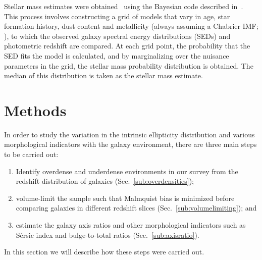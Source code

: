 \documentclass[twocolumn,useAMS,usenatbib]{mn2e}
\newcommand{\rachel}[1]{{\textcolor{red}{#1}}}
\newcommand{\sersic}{S\'{e}rsic }
\begin{document}
Stellar mass estimates were obtained~\citep{COSMOS_XRAY} using the
Bayesian code described in~\cite{KEVIN_MSTAR}.  This process involves
constructing a grid of models that vary in age, star formation
history, dust content and metallicity (always assuming a Chabrier IMF;
\citealt{ChabrierIMF}), 
 to which the observed galaxy spectral energy distributions (SEDs) and photometric redshift are compared. At each grid point, the probability that the 
SED fits the model is calculated, and by marginalizing over the nuisance parameters in the grid, the stellar mass probability distribution is obtained. The median of this distribution
is taken as the stellar mass estimate. 
  

\section{Methods}
\label{S:methods}

In order to study the variation in the intrinsic ellipticity
distribution and various morphological indicators with the galaxy environment, there are three main steps to be carried out:
\begin{enumerate}
 \item Identify overdense and underdense environments in our survey
   from the redshift distribution of galaxies (Sec.~\ref{sub:overdensities});
 \item volume-limit the sample such that Malmquist bias is minimized
   before comparing galaxies in different redshift slices
   (Sec.~\ref{sub:volumelimiting}); and 
 \item estimate the galaxy axis ratios and other morphological indicators such as  \sersic index and bulge-to-total ratios (Sec.~\ref{sub:axisratio}).
\end{enumerate}

In this section we will describe how these steps were carried out.

\end{document}
